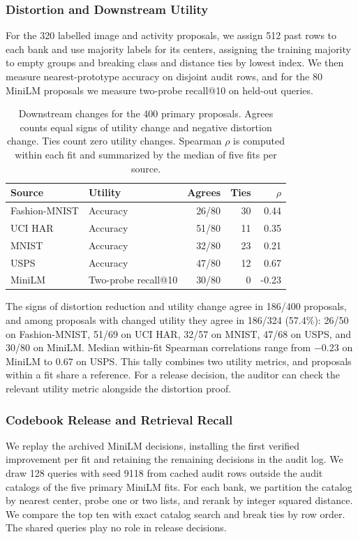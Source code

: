 \documentclass[5p,times,twocolumn]{elsarticle}
\begin{document}
\subsubsection{Distortion and Downstream Utility}
\label{sec:downstream-utility}
For the 320 labelled image and activity proposals, we assign 512 past rows to each bank and use majority labels for its centers, assigning the training majority to empty groups and breaking class and distance ties by lowest index. We then measure nearest-prototype accuracy on disjoint audit rows, and for the 80 MiniLM proposals we measure two-probe recall@10 on held-out queries.

\begin{table}[tbp]
\centering\small
\caption{Downstream changes for the 400 primary proposals. Agrees counts
equal signs of utility change and negative distortion change. Ties
count zero utility changes. Spearman $\rho$ is computed within each
fit and summarized by the median of five fits per source.}
\label{tab:downstream-utility}
\begin{tabular}{@{}llrrr@{}}\toprule
Source & Utility & Agrees & Ties & $\rho$\\\midrule
Fashion-MNIST & Accuracy & 26/80 & 30 & 0.44\\
UCI HAR & Accuracy & 51/80 & 11 & 0.35\\
MNIST & Accuracy & 32/80 & 23 & 0.21\\
USPS & Accuracy & 47/80 & 12 & 0.67\\
MiniLM & Two-probe recall@10 & 30/80 & 0 & -0.23\\
\bottomrule\end{tabular}
\end{table}

The signs of distortion reduction and utility change agree in 186/400 proposals, and among proposals with changed utility they agree in 186/324 (57.4\%): 26/50 on Fashion-MNIST, 51/69 on UCI HAR, 32/57 on MNIST, 47/68 on USPS, and 30/80 on MiniLM. Median within-fit Spearman correlations range from $-0.23$ on MiniLM to $0.67$ on USPS. This tally combines two utility metrics, and proposals within a fit share a reference. For a release decision, the auditor can check the relevant utility metric alongside the distortion proof.

\subsubsection{Codebook Release and Retrieval Recall}
\label{sec:ivf-release}
We replay the archived MiniLM decisions, installing the first verified improvement per fit and retaining the remaining decisions in the audit log. We draw 128 queries with seed 9118 from cached audit rows outside the audit catalogs of the five primary MiniLM fits. For each bank, we partition the catalog by nearest center, probe one or two lists, and rerank by integer squared distance. We compare the top ten with exact catalog search and break ties by row order. The shared queries play no role in release decisions.
\end{document}
